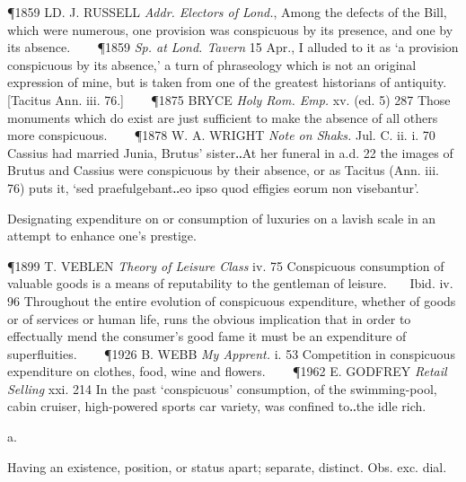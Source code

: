 \begin{description}[wide, labelwidth=!, labelindent=0pt]
\begin{myenumerate}
\P 1859 LD. J. RUSSELL  \textit{Addr. Electors of Lond.}, Among the defects of the Bill, which were numerous, one provision was conspicuous by its presence, and one by its absence.    
\P 1859 \textit{Sp. at Lond. Tavern} 15 Apr., I alluded to it as ‘a provision conspicuous by its absence,’ a turn of phraseology which is not an original expression of mine, but is taken from one of the greatest historians of antiquity. [Tacitus Ann. iii. 76.]    
\P 1875 BRYCE  \textit{Holy Rom. Emp.} xv. (ed. 5) 287 Those monuments which do exist are just sufficient to make the absence of all others more conspicuous.    
\P 1878 W. A. WRIGHT  \textit{Note on Shaks.} Jul. C. ii. i. 70 Cassius had married Junia, Brutus' sister‥At her funeral in a.d. 22 the images of Brutus and Cassius were conspicuous by their absence, or as Tacitus (Ann. iii. 76) puts it, ‘sed praefulgebant‥eo ipso quod effigies eorum non visebantur’.

 Designating expenditure on or consumption of luxuries on a lavish scale in an attempt to enhance one's prestige.

\P 1899 T. VEBLEN  \textit{Theory of Leisure Class} iv. 75 Conspicuous consumption of valuable goods is a means of reputability to the gentleman of leisure.    Ibid. iv. 96 Throughout the entire evolution of conspicuous expenditure, whether of goods or of services or human life, runs the obvious implication that in order to effectually mend the consumer's good fame it must be an expenditure of superfluities.    
\P 1926 B. WEBB  \textit{My Apprent.} i. 53 Competition in conspicuous expenditure on clothes, food, wine and flowers.    
\P 1962 E. GODFREY  \textit{Retail Selling} xxi. 214 In the past ‘conspicuous’ consumption, of the swimming-pool, cabin cruiser, high-powered sports car variety, was confined to‥the idle rich.
\end{myenumerate}


 a.

\noindent {}

\vspace{-0.3cm}

\begin{myenumerate}

 Having an existence, position, or status apart; separate, distinct. Obs. exc. dial.


\end{myenumerate}
\end{description}
